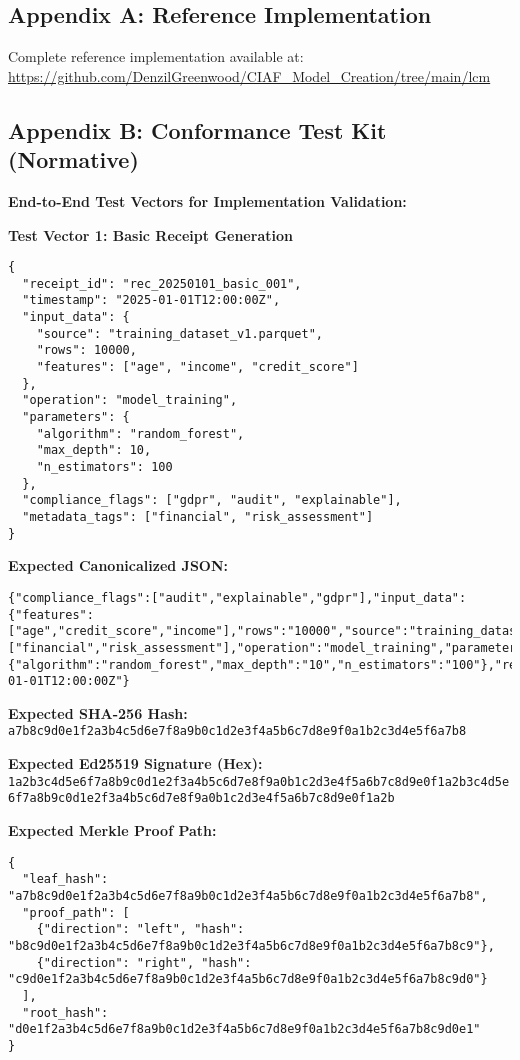 \documentclass[12pt,a4paper]{article}
\begin{document}
\subsection*{Appendix A: Reference Implementation}

Complete reference implementation available at: \\
\url{https://github.com/DenzilGreenwood/CIAF_Model_Creation/tree/main/lcm}

\subsection*{Appendix B: Conformance Test Kit (Normative)}

\textbf{End-to-End Test Vectors for Implementation Validation:}

\textbf{Test Vector 1: Basic Receipt Generation}
\begin{lstlisting}[caption=Input Receipt JSON]
{
  "receipt_id": "rec_20250101_basic_001",
  "timestamp": "2025-01-01T12:00:00Z",
  "input_data": {
    "source": "training_dataset_v1.parquet",
    "rows": 10000,
    "features": ["age", "income", "credit_score"]
  },
  "operation": "model_training",
  "parameters": {
    "algorithm": "random_forest",
    "max_depth": 10,
    "n_estimators": 100
  },
  "compliance_flags": ["gdpr", "audit", "explainable"],
  "metadata_tags": ["financial", "risk_assessment"]
}
\end{lstlisting}

\textbf{Expected Canonicalized JSON:}
\begin{lstlisting}[caption=Canonical Form]
{"compliance_flags":["audit","explainable","gdpr"],"input_data":{"features":["age","credit_score","income"],"rows":"10000","source":"training_dataset_v1.parquet"},"metadata_tags":["financial","risk_assessment"],"operation":"model_training","parameters":{"algorithm":"random_forest","max_depth":"10","n_estimators":"100"},"receipt_id":"rec_20250101_basic_001","timestamp":"2025-01-01T12:00:00Z"}
\end{lstlisting}

\textbf{Expected SHA-256 Hash:}
\texttt{a7b8c9d0e1f2a3b4c5d6e7f8a9b0c1d2e3f4a5b6c7d8e9f0a1b2c3d4e5f6a7b8}

\textbf{Expected Ed25519 Signature (Hex):}
\texttt{1a2b3c4d5e6f7a8b9c0d1e2f3a4b5c6d7e8f9a0b1c2d3e4f5a6b7c8d9e0f1a2b3c4d5e6f7a8b9c0d1e2f3a4b5c6d7e8f9a0b1c2d3e4f5a6b7c8d9e0f1a2b}

\textbf{Expected Merkle Proof Path:}
\begin{lstlisting}[caption=Merkle Proof JSON]
{
  "leaf_hash": "a7b8c9d0e1f2a3b4c5d6e7f8a9b0c1d2e3f4a5b6c7d8e9f0a1b2c3d4e5f6a7b8",
  "proof_path": [
    {"direction": "left", "hash": "b8c9d0e1f2a3b4c5d6e7f8a9b0c1d2e3f4a5b6c7d8e9f0a1b2c3d4e5f6a7b8c9"},
    {"direction": "right", "hash": "c9d0e1f2a3b4c5d6e7f8a9b0c1d2e3f4a5b6c7d8e9f0a1b2c3d4e5f6a7b8c9d0"}
  ],
  "root_hash": "d0e1f2a3b4c5d6e7f8a9b0c1d2e3f4a5b6c7d8e9f0a1b2c3d4e5f6a7b8c9d0e1"
}
\end{lstlisting}
\end{document}

